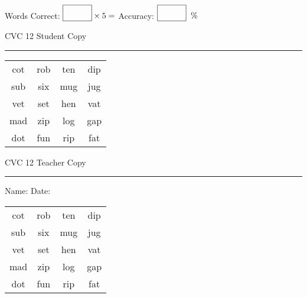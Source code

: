 \documentclass{memoir}
\begin{document}
\normalsize

Words Correct: $\fbox{\phantom{\huge 100}} \times 5 = $ Accuracy: $\fbox{\phantom{\huge 100}}\;\; \%$ 

\vfill

\newpage


\footnotesize \noindent
CVC 12 \hfill Student Copy
\smallskip
\hrule

\huge

\setlength{\tabcolsep}{14pt}
\def\arraystretch{2}

{\selectfont


\begin{vplace}[0.5]
\begin{center}
\begin{tabular}{cccc}
cot & rob & ten & dip \\
sub & six & mug & jug \\
vet & set & hen & vat \\
mad & zip & log & gap \\
dot & fun & rip & fat \\
\end{tabular}
\end{center}
\end{vplace}

}

\newpage

\footnotesize \noindent
CVC 12 \hfill Teacher Copy
\smallskip
\hrule

\normalsize

\vfill

\noindent
Name: \underline{\hspace{1.75in}} \hfill Date: \underline{\hspace{1in}}

\huge

{\selectfont


\begin{vplace}[0.5]
\begin{center}
\begin{tabular}{cccc}
cot & rob & ten & dip \\
sub & six & mug & jug \\
vet & set & hen & vat \\
mad & zip & log & gap \\
dot & fun & rip & fat \\
\end{tabular}
\end{center}
\end{vplace}



}
\end{document}
